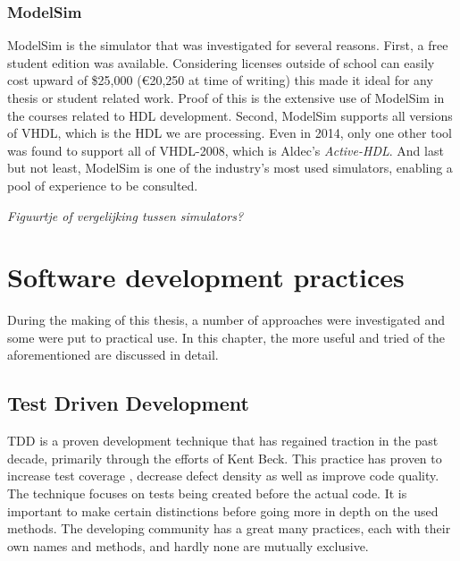 \documentclass[11pt,british]{article}
\begin{document}
\label{subsec:simtool}
\subsubsection{ModelSim}
ModelSim is the simulator that was investigated for several reasons. First, a free student edition was available. Considering licenses  outside of school can easily cost upward of \$25,000 (\euro20,250 at time of writing) this made it ideal for any thesis or student related work. Proof of this is the extensive use of ModelSim in the courses related to HDL development. Second, ModelSim supports all versions of \gls{VHDL}, which is the \gls{HDL} we are processing. Even in 2014, only one other tool was found to support all of VHDL-2008, which is Aldec's \emph{Active-HDL}. And last but not least, ModelSim is one of the industry's most used simulators, enabling a pool of experience to be consulted.\cite{ModelSim}

\emph{\color{red}Figuurtje of vergelijking tussen simulators?}\\


\newpage{}
\section{Software development practices}
During the making of this thesis, a number of approaches were investigated and some were put to practical use. In this chapter, the more useful and tried of the aforementioned are discussed in detail.


\subsection{Test Driven Development}
\label{subsec:TDD}
\gls{TDD} is a proven development technique that has regained traction in the past decade, primarily through the efforts of Kent Beck.\cite{VHDLUnit} This practice has proven to increase test coverage , decrease defect density \cite{TDDinpractice} as well as improve code quality.\cite{Siniaalto,TDDinpractice,BhatN06} The technique focuses on tests being created before the actual code. It is important to make certain distinctions before going more in depth on the used methods. The developing community has a great many practices, each with their own names and methods, and hardly none are mutually exclusive.
\end{document}
